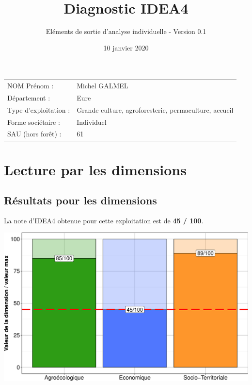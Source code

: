 \documentclass[]{article}
\title{Diagnostic IDEA4}
\subtitle{Eléments de sortie d'analyse individuelle - Version 0.1}
\author{}
\date{\vspace{-2.5em}10 janvier 2020}
\begin{document}
\maketitle

{
\setcounter{tocdepth}{3}
\tableofcontents
}

\vspace{+3cm}
\Large

\begin{longtable}[]{@{}ll@{}}
\toprule
\endhead
NOM Prénom : & Michel GALMEL\tabularnewline
Département : & Eure\tabularnewline
Type d'exploitation : & Grande culture, agroforesterie, permaculture,
accueil\tabularnewline
Forme sociétaire : & Individuel\tabularnewline
SAU (hors forêt) : & 61\tabularnewline
\bottomrule
\end{longtable}

\newpage

\hypertarget{lecture-par-les-dimensions}{%
\section{Lecture par les dimensions}\label{lecture-par-les-dimensions}}

\hypertarget{ruxe9sultats-pour-les-dimensions}{%
\subsection{Résultats pour les
dimensions}\label{ruxe9sultats-pour-les-dimensions}}

\Large

La note d'IDEA4 obtenue pour cette exploitation est de \textbf{45 /
100}.

\large

\includegraphics[width=1\linewidth]{report_files/figure-latex/unnamed-chunk-4-1}
\end{document}
